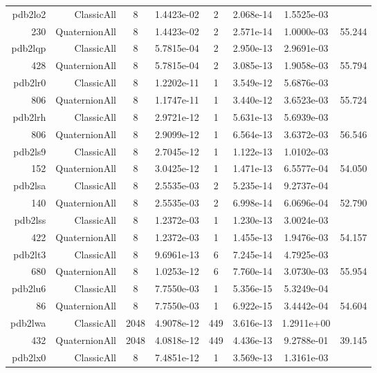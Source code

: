 \begin{xltabular}{\textwidth}{r|rcS[table-format=1.4e+2]cS[table-format=1.3e+2]S[table-format=1.4e+2]S[table-format=-1.3]}
pdb2lo2 & ClassicAll & 8 & 1.4423e-02 & 2 & 2.068e-14 & 1.5525e-03 & \\
230 & QuaternionAll & 8 & 1.4423e-02 & 2 & 2.571e-14 & 1.0000e-03 & 55.244\\  \addlinespace
pdb2lqp & ClassicAll & 8 & 5.7815e-04 & 2 & 2.950e-13 & 2.9691e-03 & \\
428 & QuaternionAll & 8 & 5.7815e-04 & 2 & 3.085e-13 & 1.9058e-03 & 55.794\\  \addlinespace
pdb2lr0 & ClassicAll & 8 & 1.2202e-11 & 1 & 3.549e-12 & 5.6876e-03 & \\
806 & QuaternionAll & 8 & 1.1747e-11 & 1 & 3.440e-12 & 3.6523e-03 & 55.724\\  \addlinespace
pdb2lrh & ClassicAll & 8 & 2.9721e-12 & 1 & 5.631e-13 & 5.6939e-03 & \\
806 & QuaternionAll & 8 & 2.9099e-12 & 1 & 6.564e-13 & 3.6372e-03 & 56.546\\  \addlinespace
pdb2ls9 & ClassicAll & 8 & 2.7045e-12 & 1 & 1.122e-13 & 1.0102e-03 & \\
152 & QuaternionAll & 8 & 3.0425e-12 & 1 & 1.471e-13 & 6.5577e-04 & 54.050\\  \addlinespace
pdb2lsa & ClassicAll & 8 & 2.5535e-03 & 2 & 5.235e-14 & 9.2737e-04 & \\
140 & QuaternionAll & 8 & 2.5535e-03 & 2 & 6.998e-14 & 6.0696e-04 & 52.790\\  \addlinespace
pdb2lss & ClassicAll & 8 & 1.2372e-03 & 1 & 1.230e-13 & 3.0024e-03 & \\
422 & QuaternionAll & 8 & 1.2372e-03 & 1 & 1.455e-13 & 1.9476e-03 & 54.157\\  \addlinespace
pdb2lt3 & ClassicAll & 8 & 9.6961e-13 & 6 & 7.245e-14 & 4.7925e-03 & \\
680 & QuaternionAll & 8 & 1.0253e-12 & 6 & 7.760e-14 & 3.0730e-03 & 55.954\\  \addlinespace
pdb2lu6 & ClassicAll & 8 & 7.7550e-03 & 1 & 5.356e-15 & 5.3249e-04 & \\
86 & QuaternionAll & 8 & 7.7550e-03 & 1 & 6.922e-15 & 3.4442e-04 & 54.604\\  \addlinespace
pdb2lwa & ClassicAll & 2048 & 4.9078e-12 & 449 & 3.616e-13 & 1.2911e+00 & \\
432 & QuaternionAll & 2048 & 4.0818e-12 & 449 & 4.436e-13 & 9.2788e-01 & 39.145\\  \addlinespace
pdb2lx0 & ClassicAll & 8 & 7.4851e-12 & 1 & 3.569e-13 & 1.3161e-03 & \\

\end{xltabular}
